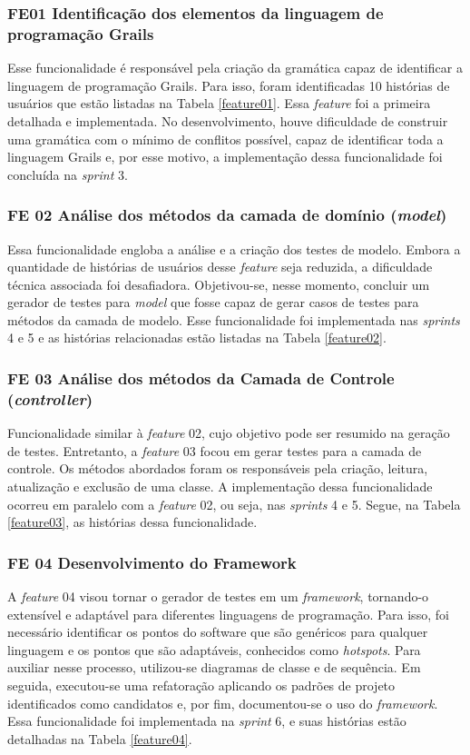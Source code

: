 \subsubsection{FE01 Identificação dos elementos da linguagem de programação Grails}
Esse funcionalidade é responsável pela criação da gramática capaz de identificar a linguagem de programação Grails. Para isso, foram identificadas 10 histórias de usuários que estão listadas na Tabela \ref{feature01}. Essa \textit{feature} foi a primeira detalhada e implementada. No desenvolvimento, houve dificuldade de construir uma gramática com o mínimo de conflitos possível, capaz de identificar toda a linguagem Grails e, por esse motivo, a implementação dessa funcionalidade foi concluída na \textit{sprint} 3.

\subsubsection{FE 02 Análise dos métodos da camada de domínio (\textit{model})}
Essa funcionalidade engloba a análise e a criação dos testes de modelo. Embora a quantidade de histórias de usuários desse \textit{feature} seja reduzida, a dificuldade técnica associada foi desafiadora. Objetivou-se, nesse momento, concluir um gerador de testes para \textit{model} que fosse capaz de gerar casos de testes para métodos da camada de modelo. Esse funcionalidade foi implementada nas \textit{sprints} 4 e 5 e as histórias relacionadas estão listadas na Tabela \ref{feature02}.

\subsubsection{FE 03 Análise dos métodos da Camada de Controle (\textit{controller})}
Funcionalidade similar à \textit{feature} 02, cujo objetivo pode ser resumido na geração de testes. Entretanto, a \textit{feature} 03 focou em gerar testes para a camada de controle. Os métodos abordados foram os responsáveis pela criação, leitura, atualização e exclusão de uma classe. A implementação dessa funcionalidade ocorreu em paralelo com a \textit{feature} 02, ou seja, nas \textit{sprints} 4 e 5. Segue, na Tabela \ref{feature03}, as histórias dessa funcionalidade.

\subsubsection{FE 04 Desenvolvimento do Framework}
A \textit{feature} 04 visou tornar o gerador de testes em um \textit{framework}, tornando-o extensível e adaptável para diferentes linguagens de programação. Para isso, foi necessário identificar os pontos do software que são genéricos para qualquer linguagem e os pontos que são adaptáveis, conhecidos como \textit{hotspots}. Para auxiliar nesse processo, utilizou-se diagramas de classe e de sequência. Em seguida, executou-se uma refatoração aplicando os padrões de projeto identificados como candidatos e, por fim, documentou-se o uso do \textit{framework}. Essa funcionalidade foi implementada na \textit{sprint} 6, e suas histórias estão detalhadas na Tabela \ref{feature04}.

